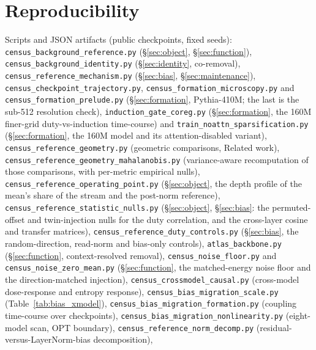 \documentclass[11pt]{article}
\begin{document}
\section{Reproducibility}

{\raggedright
Scripts and JSON artifacts (public checkpoints, fixed seeds):
\texttt{census\_background\_reference.py} (\S\ref{sec:object},
\S\ref{sec:function}),
\texttt{census\_background\_identity.py} (\S\ref{sec:identity},
co-removal),
\texttt{census\_reference\_mechanism.py} (\S\ref{sec:bias},
\S\ref{sec:maintenance}),
\texttt{census\_checkpoint\_trajectory.py},
\texttt{census\_formation\_microscopy.py} and
\texttt{census\_formation\_prelude.py} (\S\ref{sec:formation},
Pythia-410M; the last is the sub-512 resolution check),
\texttt{induction\_gate\_coreg.py} (\S\ref{sec:formation}, the 160M
finer-grid duty-vs-induction time-course) and
\texttt{train\_noattn\_sparsification.py} (\S\ref{sec:formation}, the
160M model and its attention-disabled variant),
\texttt{census\_reference\_geometry.py} (geometric comparisons,
Related work),
\texttt{census\_reference\_geometry\_mahalanobis.py} (variance-aware
recomputation of those comparisons, with per-metric empirical nulls),
\texttt{census\_reference\_operating\_point.py} (\S\ref{sec:object},
the depth profile of the mean's share of the stream and the post-norm
reference),
\texttt{census\_reference\_statistic\_nulls.py} (\S\ref{sec:object},
\S\ref{sec:bias}: the permuted-offset and twin-injection nulls for the
duty correlation, and the cross-layer cosine and transfer matrices),
\texttt{census\_reference\_duty\_controls.py} (\S\ref{sec:bias}, the
random-direction, read-norm and bias-only controls),
\texttt{atlas\_backbone.py} (\S\ref{sec:function}, context-resolved
removal),
\texttt{census\_noise\_floor.py} and
\texttt{census\_noise\_zero\_mean.py} (\S\ref{sec:function}, the
matched-energy noise floor and the direction-matched injection),
\texttt{census\_crossmodel\_causal.py} (cross-model dose-response and
entropy response),
\texttt{census\_bias\_migration\_scale.py} (Table~\ref{tab:bias_xmodel}),
\texttt{census\_bias\_migration\_formation.py} (coupling time-course
over checkpoints),
\texttt{census\_bias\_migration\_nonlinearity.py} (eight-model scan,
OPT boundary),
\texttt{census\_reference\_norm\_decomp.py} (residual-versus-LayerNorm-bias
decomposition),

}
\end{document}
